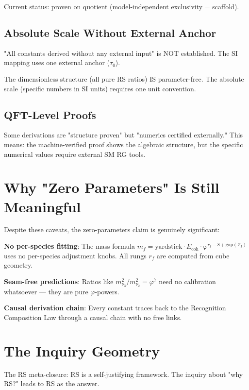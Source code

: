 \documentclass[12pt,a4paper]{article}
\theoremstyle{definition}
\theoremstyle{remark}
\begin{document}
Current status: proven on quotient (model-independent exclusivity = scaffold).

\subsection{Absolute Scale Without External Anchor}

"All constants derived without any external input" is NOT established.
The SI mapping uses one external anchor ($\tau_0$).

The dimensionless structure (all pure RS ratios) IS parameter-free.
The absolute scale (specific numbers in SI units) requires one unit convention.

\subsection{QFT-Level Proofs}

Some derivations are "structure proven" but "numerics certified externally." 
This means: the machine-verified proof shows the algebraic structure, but the specific 
numerical values require external SM RG tools.

\section{Why "Zero Parameters" Is Still Meaningful}

Despite these caveats, the zero-parameters claim is genuinely significant:

\textbf{No per-species fitting}: The mass formula $m_f = \text{yardstick} \cdot E_\mathrm{coh} \cdot \varphi^{r_f - 8 + \text{gap}(Z_f)}$ uses 
no per-species adjustment knobs. All rungs $r_f$ are computed from cube geometry.

\textbf{Seam-free predictions}: Ratios like $m_{\nu_3}^2/m_{\nu_2}^2 = \varphi^7$ 
need no calibration whatsoever — they are pure $\varphi$-powers.

\textbf{Causal derivation chain}: Every constant traces back to the Recognition 
Composition Law through a causal chain with no free links.

\section{The Inquiry Geometry}

The RS meta-closure: RS is a self-justifying framework. The inquiry about 
"why RS?" leads to RS as the answer.
\end{document}
